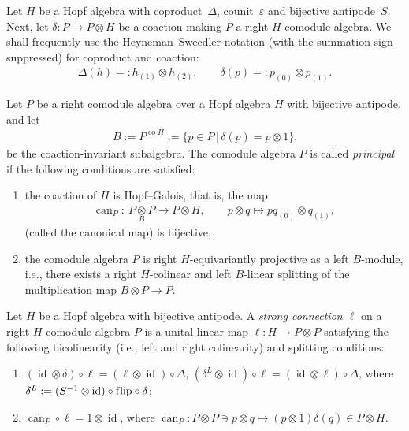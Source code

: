 \documentclass[11pt]{article}
\numberwithin{equation}{section}
\begin{document}
Let $H$ be a Hopf algebra with coproduct~$\Delta$, counit~$\varepsilon$ and bijective
antipode~$S$. Next, let \mbox{$\delta\colon P\to P\otimes H$} be a coaction making $P$ a right
\mbox{$H$-comodule} algebra.
We shall frequently use
the Heyneman--Sweedler notation (with the summation sign suppressed) for coproduct and coaction:
\begin{gather*}
\Delta (h)=:h_{(1)}\otimes h_{(2)} ,\qquad
\delta(p)=:p_{(0)}\otimes p_{(1)} .
\end{gather*}
\begin{Definition}
Let $P$ be a right comodule algebra over a Hopf algebra
$H$ with bijective antipode, and let
\begin{gather*}
B:=P^{\operatorname{co}H} := \{ p \in P \, | \, \delta (p) = p \otimes 1 \}.
\end{gather*}
be the coaction-invariant
subalgebra. The comodule algebra $P$
is called {\em principal} if the following conditions are satisf\/ied:
\begin{enumerate}\itemsep=0pt
\item[1)]
the coaction of $H$ is Hopf--Galois, that is, the map
\begin{gather*}
\operatorname{can}_P \colon \  P \underset{B}{\otimes} P \longrightarrow P \otimes H,\qquad
	p \otimes q \longmapsto pq_{(0)} \otimes q_{(1)} ,
\end{gather*}
(called the canonical map) is bijective,
\item[2)]
the comodule algebra $P$ is right
$H$-equivariantly projective as a left  $B$-module, i.e.,
 there exists
 a right $H$-colinear and left $B$-linear
splitting of the multiplication map
$B \otimes P \rightarrow P$.
\end{enumerate}
\end{Definition}

\begin{Definition}[\cite{bh04}]\label{strong}
Let $ H$ be a Hopf algebra with  bijective antipode.
A \emph{strong connection $\ell$} on a right $H$-comodule algebra $P$ is a unital linear map $\ell\colon  H
\rightarrow  P \otimes  P$ satisfying
the following bicolinearity (i.e., left and right colinearity) and splitting conditions:
\begin{enumerate}\itemsep=0pt
\item[1)]
$(\operatorname{id}\otimes \delta) \circ
\ell = (\ell \otimes \operatorname{id}) \circ \Delta$,
$(\delta^L \otimes \operatorname{id}) \circ
\ell = (\operatorname{id} \otimes \ell) \circ
\Delta$, where
$\delta^L :=(S^{-1}\otimes\operatorname{id})\circ\mathrm{f\/lip}\circ\delta$;
\item[2)]
$\widetilde{\operatorname{can}_P} \circ \ell=1 \otimes \operatorname{id}$, where
$\widetilde{\operatorname{can}_P}\colon  P\otimes  P\ni p\otimes q\mapsto (p\otimes 1)\delta(q)\in  P\otimes H$.
\end{enumerate}
\end{Definition}
\end{document}
